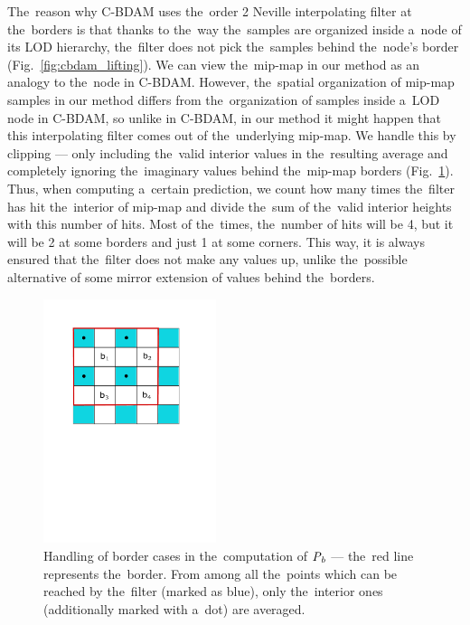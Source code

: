 The~reason why C-BDAM uses the~order 2 Neville interpolating filter at the~borders is that thanks to the~way the~samples are organized inside a~node of its LOD hierarchy, the~filter does not pick the~samples behind the~node's border (Fig.~\ref{fig:cbdam_lifting}). We can view the~mip-map in our method as an analogy to the~node in C-BDAM. However, the~spatial organization of mip-map samples in our method differs from the~organization of samples inside a~LOD node in C-BDAM, so unlike in C-BDAM, in our method it might happen that this interpolating filter comes out of the~underlying mip-map. We handle this by clipping --- only including the~valid interior values in the~resulting average and completely ignoring the~imaginary values behind the~mip-map borders (Fig.~\ref{fig:bborders}). Thus, when computing a~certain prediction, we count how many times the~filter has hit the~interior of mip-map and divide the~sum of the~valid interior heights with this number of hits. Most of the~times, the~number of hits will be 4, but it will be 2 at some borders and just 1 at some corners. This way, it is always ensured that the~filter does not make any values up, unlike the~possible alternative of some mirror extension of values behind the~borders.

\begin{figure}
	\includegraphics[trim={1cm 14cm 2cm 0}, clip, width=0.45\textwidth]{figures/bborders.pdf}\centering
	\caption{Handling of border cases in the~computation of $\mathit{P_{b}}$ --- the~red line represents the~border. From among all the~points which can be reached by the~filter (marked as blue), only the~interior ones (additionally marked with a~dot) are averaged.}
	\label{fig:bborders}
\end{figure}


